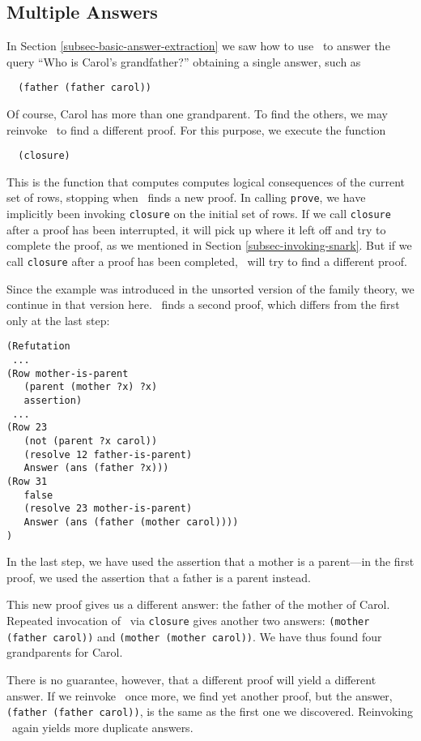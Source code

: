 \subsection{Multiple Answers}
\label{subsec-multiple-answers}
In Section \ref{subsec-basic-answer-extraction} we saw how to use
\snark\  to answer the query ``Who is Carol's grandfather?'' obtaining
a single answer, such as
\begin{verbatim}
  (father (father carol))
\end{verbatim}
Of course, Carol has more than one grandparent.  To find the others,
we may reinvoke \snark\  to find a different proof.  For this purpose,
we execute the function
\begin{verbatim}
  (closure)
\end{verbatim}
This is the function that computes computes logical consequences of
the current set of rows, stopping when \snark\  finds a new proof.  In
calling {\tt prove}, we have implicitly been invoking {\tt closure} on
the initial set of rows.  If we call {\tt closure} after a proof has
been interrupted, it will pick up where it left off and try to complete
the proof, as we mentioned in Section \ref{subsec-invoking-snark}.
But if we call {\tt closure} after a proof has been completed, \snark\
will try to find a different proof.


Since the example was introduced in the unsorted version of the family
theory, we continue in that version here.  \Snark\  finds a second
proof, which differs from the first only at the last step:
\begin{verbatim}
(Refutation
 ...
(Row mother-is-parent
   (parent (mother ?x) ?x)
   assertion)
 ...
(Row 23
   (not (parent ?x carol))
   (resolve 12 father-is-parent)
   Answer (ans (father ?x)))
(Row 31
   false
   (resolve 23 mother-is-parent)
   Answer (ans (father (mother carol))))
)
\end{verbatim}
In the last step, we have used the assertion that a mother is a
parent---in the first proof, we used the assertion that a father is a
parent instead.

This new proof gives us a different answer: the father of the mother
of Carol.  Repeated invocation of \snark\  via {\tt closure} gives
another two answers: \verb|(mother (father carol))| and
\verb|(mother (mother carol))|.  We have thus found four grandparents
for Carol.

There is no guarantee, however, that a different proof will yield a
different answer.  If we reinvoke \snark\  once more, we find yet
another proof, but the answer, \verb|(father (father carol))|, is the
same as the first one we discovered.  Reinvoking \snark\  again yields
more duplicate answers.

